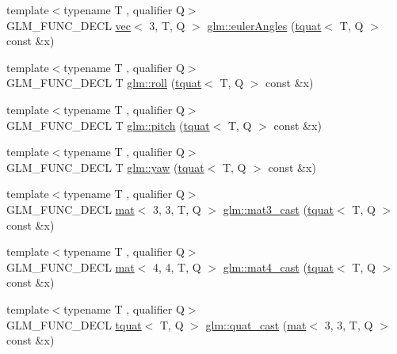 \begin{DoxyCompactItemize}
\item 
{\footnotesize template$<$typename T , qualifier Q$>$ }\\G\+L\+M\+\_\+\+F\+U\+N\+C\+\_\+\+D\+E\+CL \hyperlink{structglm_1_1vec}{vec}$<$ 3, T, Q $>$ \hyperlink{group__gtc__quaternion_gaf21424fa62e03de8b11c2b776c17d7a3}{glm\+::euler\+Angles} (\hyperlink{structglm_1_1tquat}{tquat}$<$ T, Q $>$ const \&x)
\item 
{\footnotesize template$<$typename T , qualifier Q$>$ }\\G\+L\+M\+\_\+\+F\+U\+N\+C\+\_\+\+D\+E\+CL T \hyperlink{group__gtc__quaternion_ga3ff93afbd9cc29f2ad217f2228e8a95b}{glm\+::roll} (\hyperlink{structglm_1_1tquat}{tquat}$<$ T, Q $>$ const \&x)
\item 
{\footnotesize template$<$typename T , qualifier Q$>$ }\\G\+L\+M\+\_\+\+F\+U\+N\+C\+\_\+\+D\+E\+CL T \hyperlink{group__gtc__quaternion_ga9bd78e5fe153d07e39fb4c83e73dba73}{glm\+::pitch} (\hyperlink{structglm_1_1tquat}{tquat}$<$ T, Q $>$ const \&x)
\item 
{\footnotesize template$<$typename T , qualifier Q$>$ }\\G\+L\+M\+\_\+\+F\+U\+N\+C\+\_\+\+D\+E\+CL T \hyperlink{group__gtc__quaternion_ga53feffeb4001b99e36e216522e465e9e}{glm\+::yaw} (\hyperlink{structglm_1_1tquat}{tquat}$<$ T, Q $>$ const \&x)
\item 
{\footnotesize template$<$typename T , qualifier Q$>$ }\\G\+L\+M\+\_\+\+F\+U\+N\+C\+\_\+\+D\+E\+CL \hyperlink{structglm_1_1mat}{mat}$<$ 3, 3, T, Q $>$ \hyperlink{group__gtc__quaternion_ga6e88f15c94effe737c876d21ea0db101}{glm\+::mat3\+\_\+cast} (\hyperlink{structglm_1_1tquat}{tquat}$<$ T, Q $>$ const \&x)
\item 
{\footnotesize template$<$typename T , qualifier Q$>$ }\\G\+L\+M\+\_\+\+F\+U\+N\+C\+\_\+\+D\+E\+CL \hyperlink{structglm_1_1mat}{mat}$<$ 4, 4, T, Q $>$ \hyperlink{group__gtc__quaternion_ga8e2085f17cd5aae423c04536524f11b3}{glm\+::mat4\+\_\+cast} (\hyperlink{structglm_1_1tquat}{tquat}$<$ T, Q $>$ const \&x)
\item 
{\footnotesize template$<$typename T , qualifier Q$>$ }\\G\+L\+M\+\_\+\+F\+U\+N\+C\+\_\+\+D\+E\+CL \hyperlink{structglm_1_1tquat}{tquat}$<$ T, Q $>$ \hyperlink{group__gtc__quaternion_ga03e023aec9acd561a28594bbc8a3abf6}{glm\+::quat\+\_\+cast} (\hyperlink{structglm_1_1mat}{mat}$<$ 3, 3, T, Q $>$ const \&x)
\item 

\end{DoxyCompactItemize}

